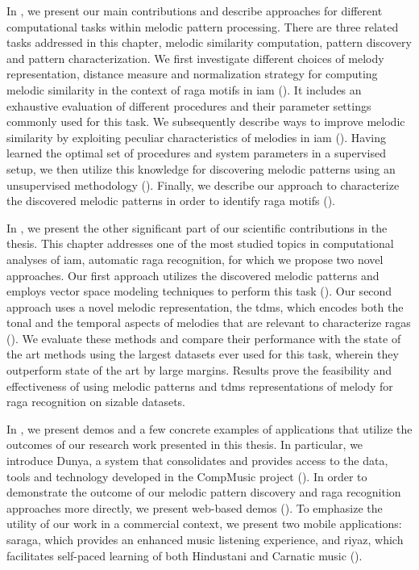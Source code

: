 In , we present our main contributions and describe approaches for different computational tasks within melodic pattern processing. There are three related tasks addressed in this chapter, melodic similarity computation, pattern discovery and pattern characterization. We first investigate different choices of melody representation, distance measure and normalization strategy for computing melodic similarity in the context of \gls{raga} motifs in \gls{iam} (). It includes an exhaustive evaluation of different procedures and their parameter settings commonly used for this task. We subsequently describe ways to improve melodic similarity by exploiting peculiar characteristics of melodies in \gls{iam} (). Having learned the optimal set of procedures and system parameters in a supervised setup, we then utilize this knowledge for discovering melodic patterns using an unsupervised methodology (). Finally, we describe our approach to characterize the discovered melodic patterns in order to identify \gls{raga} motifs (). 

In , we present the other significant part of our scientific contributions in the thesis. This chapter addresses one of the most studied topics in computational analyses of \gls{iam}, automatic \gls{raga} recognition, for which we propose two novel approaches. Our first approach utilizes the discovered melodic patterns and employs vector space modeling techniques to perform this task (). Our second approach uses a novel melodic representation, the \gls{tdms}, which encodes both the tonal and the temporal aspects of melodies that are relevant to characterize \glspl{raga} (). We evaluate these methods and compare their performance with the state of the art methods using the largest datasets ever used for this task, wherein they outperform state of the art by large margins. Results prove the feasibility and effectiveness of using melodic patterns and \gls{tdms} representations of melody for \gls{raga} recognition on sizable datasets.

In , we present demos and a few concrete examples of applications that utilize the outcomes of our research work presented in this thesis. In particular, we introduce Dunya, a system that consolidates and provides access to the data, tools and technology developed in the CompMusic project (). In order to demonstrate the outcome of our melodic pattern discovery and \gls{raga} recognition approaches more directly, we present web-based demos (). To emphasize the utility of our work in a commercial context, we present two mobile applications: \gls{saraga}, which provides an enhanced music listening experience, and \gls{riyaz}, which facilitates self-paced learning of both Hindustani and Carnatic music (). 

